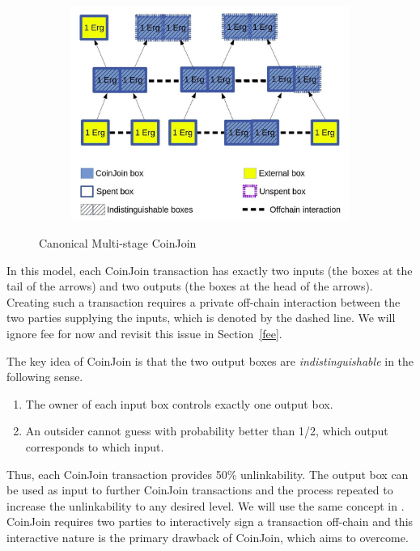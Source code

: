 \documentclass[runningheads]{llncs}
\begin{document}
\begin{figure}[h]
	\centering
	\begin{subfigure}{.6\textwidth}
		\centering
		\includegraphics[width=\linewidth]{CoinJoin.jpg}
	\end{subfigure}%
	\caption{Canonical Multi-stage CoinJoin}
	\label{fig:coinjoin}
\end{figure}

In this model, each CoinJoin transaction has exactly two inputs (the boxes at the tail of the arrows) and two outputs (the boxes at the head of the arrows). Creating such a transaction requires a private off-chain interaction between the two parties supplying the inputs, which is denoted by the dashed line. We will ignore fee for now and revisit this issue in Section~\ref{fee}.

The key idea of CoinJoin is that the two output boxes are {\em indistinguishable} in the following sense. 
\begin{enumerate}
    \item The owner of each input box controls exactly one output box.
    \item An outsider cannot guess with probability better than 1/2, which output corresponds to which input.
\end{enumerate}

Thus, each CoinJoin transaction provides 50\% unlinkability. The output box can be used as input to further CoinJoin transactions and the process repeated to increase the unlinkability to any desired level. We will use the same concept in \algname. 
CoinJoin requires two parties to interactively sign a transaction off-chain and this interactive nature is the primary drawback of CoinJoin, which \algname aims to overcome. 
\end{document}
